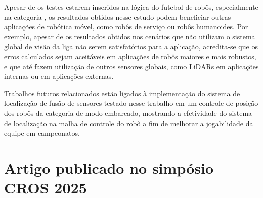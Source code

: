 \documentclass[acronym, symbols, table, deposito]{fei}
\begin{document}
	Apesar de os testes estarem inseridos na lógica do futebol de robôs, especialmente na categoria , os resultados obtidos nesse estudo podem beneficiar outras aplicações de robótica móvel, como robôs de serviço ou robôs humanoides. Por exemplo, apesar de os resultados obtidos nos cenários que não utilizam o sistema global de visão da liga não serem satisfatórios para a aplicação, acredita-se que os erros calculados sejam aceitáveis em aplicações de robôs maiores e mais robustos, e que até fazem utilização de outros sensores globais, como LiDARs em aplicações internas ou  em aplicações externas.
	
	Trabalhos futuros relacionados estão ligados à implementação do sistema de localização de fusão de sensores testado nesse trabalho em um controle de posição dos robôs da categoria de modo embarcado, mostrando a efetividade do sistema de localização na malha de controle do robô a fim de melhorar a jogabilidade da equipe em campeonatos.
	
\printbibliography

\anexos

\chapter{Artigo publicado no simpósio CROS 2025}

%
%

%

\end{document}
